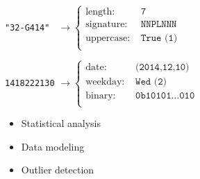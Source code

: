 \begin{block}{}
  
  \texttt{"32-G414"~} $\longrightarrow
  \begin{cases}
    \text{length: } & \texttt{7}\\
    \text{signature: } & \texttt{NNPLNNN}\\
    \text{uppercase: } & \texttt{True (1)}\\
  \end{cases}$
  
  \texttt{1418222130} $\longrightarrow
  \begin{cases}
    \text{date: } & \texttt{(2014,12,10)}\\
    \text{weekday: } & \texttt{Wed (2)}\\
    \text{binary: } & \texttt{0b10101\ldots010}\\
  \end{cases}$
  
  \begin{itemize}
  \item Statistical analysis
  \item Data modeling
  \item Outlier detection
  \end{itemize}
\end{block}